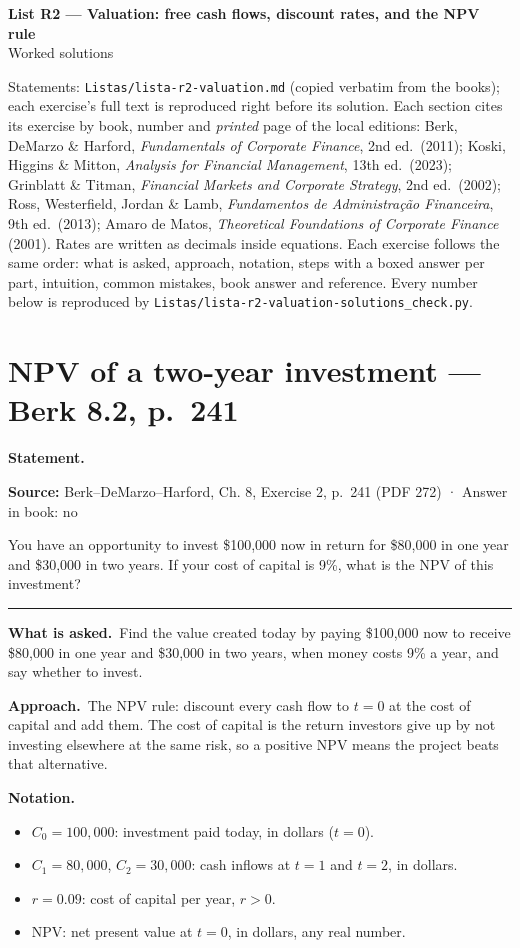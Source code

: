 \documentclass[11pt,a4paper]{article}
\numberwithin{equation}{section}
\newenvironment{notation}{\par\noindent\textbf{Notation.}\begin{itemize}[leftmargin=1.4em]}{\end{itemize}}
\newcommand{\asked}{\par\medskip\noindent\textbf{What is asked.}~}
\newcommand{\approach}{\par\smallskip\noindent\textbf{Approach.}~}
\newcommand{\stmtbegin}{\par\medskip\noindent\textbf{Statement.}\par\nopagebreak\begingroup\small\setlength{\tabcolsep}{3pt}\sloppy}
\newcommand{\stmtend}{\par\endgroup\nopagebreak\noindent\rule{\linewidth}{0.4pt}\par\medskip}
\begin{document}
\begin{center}
  {\Large\bfseries List R2 --- Valuation: free cash flows, discount rates, and the NPV rule}\\[4pt]
  {\large Worked solutions}
\end{center}

\noindent Statements: \texttt{Listas/lista-r2-valuation.md} (copied verbatim from the books); each
exercise's full text is reproduced right before its solution. Each section cites its exercise by book, number and \emph{printed} page of the
local editions: Berk, DeMarzo \& Harford, \emph{Fundamentals of Corporate Finance}, 2nd ed.\
(2011); Koski, Higgins \& Mitton, \emph{Analysis for Financial Management}, 13th ed.\ (2023);
Grinblatt \& Titman, \emph{Financial Markets and Corporate Strategy}, 2nd ed.\ (2002); Ross,
Westerfield, Jordan \& Lamb, \emph{Fundamentos de Administra\c{c}\~ao Financeira}, 9th ed.\ (2013);
Amaro de Matos, \emph{Theoretical Foundations of Corporate Finance} (2001). Rates are written as
decimals inside equations. Each exercise follows the same order: what is asked, approach,
notation, steps with a boxed answer per part, intuition, common mistakes, book answer and
reference. Every number below is reproduced by
\texttt{Listas/lista-r2-valuation-solutions\_check.py}.

\section{NPV of a two-year investment --- Berk 8.2, p.~241}
\stmtbegin
\textbf{Source:} Berk--DeMarzo--Harford, Ch. 8, Exercise 2, p.~241 (PDF 272) · Answer in book: no

You have an opportunity to invest \$100,000 now in return for \$80,000 in one year and \$30,000 in
two years. If your cost of capital is 9\%, what is the NPV of this investment?
\stmtend

\asked Find the value created today by paying \$100{,}000 now to receive \$80{,}000 in one year
and \$30{,}000 in two years, when money costs 9\% a year, and say whether to invest.

\approach The NPV rule: discount every cash flow to $t=0$ at the cost of capital and add them.
The cost of capital is the return investors give up by not investing elsewhere at the same risk,
so a positive NPV means the project beats that alternative.

\begin{notation}
  \item $C_0=100{,}000$: investment paid today, in dollars ($t=0$).
  \item $C_1=80{,}000$, $C_2=30{,}000$: cash inflows at $t=1$ and $t=2$, in dollars.
  \item $r=0.09$: cost of capital per year, $r>0$.
  \item $\mathrm{NPV}$: net present value at $t=0$, in dollars, any real number.
\end{notation}
\end{document}

